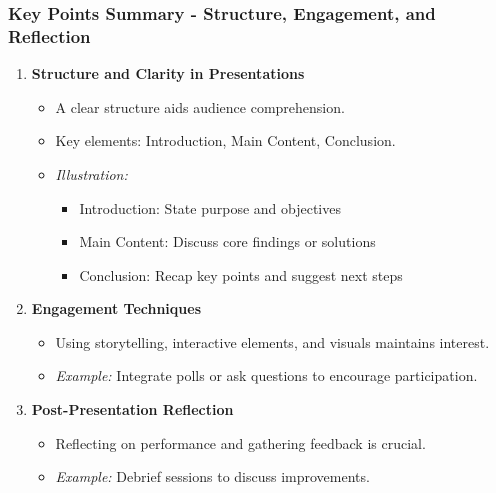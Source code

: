 \documentclass[aspectratio=169]{beamer}
\begin{document}
\begin{frame}[fragile]
    \frametitle{Key Points Summary - Structure, Engagement, and Reflection}
    \begin{enumerate}[resume]
        \item \textbf{Structure and Clarity in Presentations}
        \begin{itemize}
            \item A clear structure aids audience comprehension.
            \item Key elements: Introduction, Main Content, Conclusion.
            \item \textit{Illustration:} 
            \begin{itemize}
                \item Introduction: State purpose and objectives 
                \item Main Content: Discuss core findings or solutions 
                \item Conclusion: Recap key points and suggest next steps
            \end{itemize}
        \end{itemize}

        \item \textbf{Engagement Techniques}
        \begin{itemize}
            \item Using storytelling, interactive elements, and visuals maintains interest.
            \item \textit{Example:} Integrate polls or ask questions to encourage participation.
        \end{itemize}

        \item \textbf{Post-Presentation Reflection}
        \begin{itemize}
            \item Reflecting on performance and gathering feedback is crucial.
            \item \textit{Example:} Debrief sessions to discuss improvements.
        \end{itemize}
    \end{enumerate}
\end{frame}
\end{document}
